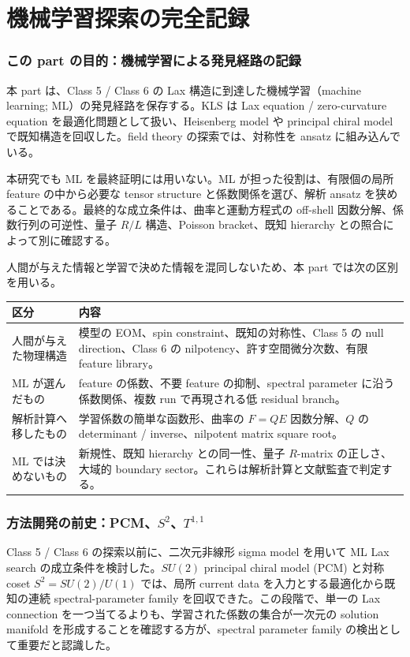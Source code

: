 \part{機械学習探索の完全記録}

\section{この part の目的：機械学習による発見経路の記録}
\label{sec:ml-purpose}
本 part は、Class 5 / Class 6 の Lax 構造に到達した機械学習（machine learning; ML）の発見経路を保存する。KLS は Lax equation / zero-curvature equation を最適化問題として扱い、Heisenberg model や principal chiral model で既知構造を回収した\cite{KLS2021}。field theory の探索では、対称性を ansatz に組み込んでいる。

本研究でも ML を最終証明には用いない。ML が担った役割は、有限個の局所 feature の中から必要な tensor structure と係数関係を選び、解析 ansatz を狭めることである。最終的な成立条件は、曲率と運動方程式の off-shell 因数分解、係数行列の可逆性、量子 $R/L$ 構造、Poisson bracket、既知 hierarchy との照合によって別に確認する。

人間が与えた情報と学習で決めた情報を混同しないため、本 part では次の区別を用いる。
\begin{longtable}{L{39mm}L{103mm}}
\toprule
区分 & 内容\\
\midrule\endhead
人間が与えた物理構造 & 模型の EOM、spin constraint、既知の対称性、Class 5 の null direction、Class 6 の nilpotency、許す空間微分次数、有限 feature library。\\
ML が選んだもの & feature の係数、不要 feature の抑制、spectral parameter に沿う係数関係、複数 run で再現される低 residual branch。\\
解析計算へ移したもの & 学習係数の簡単な函数形、曲率の $F=QE$ 因数分解、$Q$ の determinant / inverse、nilpotent matrix square root。\\
ML では決めないもの & 新規性、既知 hierarchy との同一性、量子 $R$-matrix の正しさ、大域的 boundary sector。これらは解析計算と文献監査で判定する。\\
\bottomrule
\end{longtable}

\section{方法開発の前史：PCM、$S^2$、$T^{1,1}$}
\label{sec:ml-prehistory}
Class 5 / Class 6 の探索以前に、二次元非線形 sigma model を用いて ML Lax search の成立条件を検討した。$SU(2)$ principal chiral model (PCM) と対称 coset $S^2=SU(2)/U(1)$ では、局所 current data を入力とする最適化から既知の連続 spectral-parameter family を回収できた。この段階で、単一の Lax connection を一つ当てるよりも、学習された係数の集合が一次元の solution manifold を形成することを確認する方が、spectral parameter family の検出として重要だと認識した。

